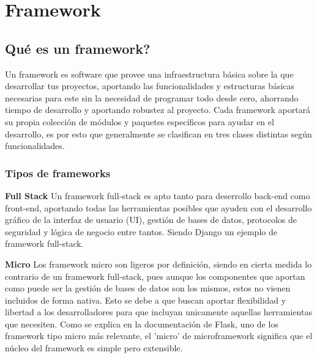 \newpage

\section{Framework}

\subsection{Qué es un framework?}
Un framework es software que provee una infraestructura básica sobre la que desarrollar tus proyectos, aportando las funcionalidades y estructuras básicas necesarias para este sin la necesidad de programar todo desde cero, ahorrando tiempo de desarrollo y aportando robustez al proyecto. \cite{ghimire2020comparative}
\newline
\newline
Cada framework aportará su propia colección de módulos y paquetes específicos para ayudar en el desarrollo, es por esto que generalmente se clasifican en tres clases distintas según funcionalidades. \cite{WebFra}

\subsubsection{Tipos de frameworks}
\textbf{Full Stack}
\newline
Un framework full-stack es apto tanto para deserrollo back-end como front-end, aportando todas las herramientas posibles que ayuden con el desarrollo gráfico de la interfaz de usuario (UI), gestión de bases de datos, protocolos de seguridad y lógica de negocio entre tantos. Siendo Django un ejemplo de framework full-stack. 
\newline
\newline

\textbf{Micro}
\newline
Los framework micro son ligeros por definición, siendo en cierta medida lo contrario de un framework full-stack, pues aunque los componentes que aportan como puede ser la gestión de bases de datos son los mismos, estos no vienen incluidos de forma nativa. Esto se debe a que buscan aportar flexibilidad y libertad a los desarrolladores para que incluyan unicamente aquellas herramientas que necesiten. 
\newline
\newline
Como se explica en la documentación de Flask, uno de los framework tipo micro más relevante, el 'micro' de microframework significa que el núcleo del framework es simple pero extensible.
\newline
\newline

